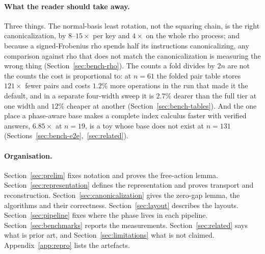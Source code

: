 \paragraph{What the reader should take away.}
Three things. The normal-basis least rotation, not the squaring
chain, is the right canonicalization, by $8$--$15\times$ per key and
$4\times$ on the whole rho process; and because a signed-Frobenius rho
spends half its instructions canonicalizing, any comparison against
rho that does not match the canonicalization is measuring the wrong
thing (Section~\ref{sec:bench-rho}). The counts a fold divides by $2n$
are not the counts the cost is proportional to: at $n=61$ the folded
pair table stores $121\times$ fewer pairs and costs $1.2\%$ more
operations in the run that made it the default, and in a separate
four-width sweep it is $2.7\%$ dearer than the full tier at one width
and $12\%$ cheaper at another
(Section~\ref{sec:bench-tables}). And the one place a phase-aware base
makes a complete index calculus faster with verified answers,
$6.85\times$ at $n=19$, is a toy whose base does not exist at
$n=131$ (Sections~\ref{sec:bench-e2e},~\ref{sec:related}).

\paragraph{Organisation.}
Section~\ref{sec:prelim} fixes notation and proves the free-action
lemma. Section~\ref{sec:representation} defines the representation and
proves transport and reconstruction. Section~\ref{sec:canonicalization}
gives the zero-gap lemma, the algorithms and their correctness.
Section~\ref{sec:layout} describes the layouts.
Section~\ref{sec:pipeline} fixes where the phase lives in each
pipeline. Section~\ref{sec:benchmarks} reports the measurements.
Section~\ref{sec:related} says what is prior art, and
Section~\ref{sec:limitations} what is not claimed.
Appendix~\ref{app:repro} lists the artefacts.
